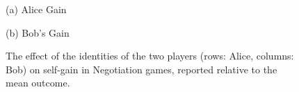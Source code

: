 \begin{figure}[ht]

\vspace{1ex}
\begin{minipage}[t]{0.48\textwidth}
    \centering
    \hspace{9em} (a) Alice Gain \par\vspace{1ex}
    
\end{minipage}
\hfill
\begin{minipage}[t]{0.48\textwidth}
    \centering
    (b) Bob's Gain \par\vspace{1ex}
    
\end{minipage}
\caption{\centering
The effect of the identities of the two players (rows: Alice, columns: Bob) on self-gain in Negotiation games, reported relative to the mean outcome.}
\label{table:negotiation_self_gain}
\end{figure}


